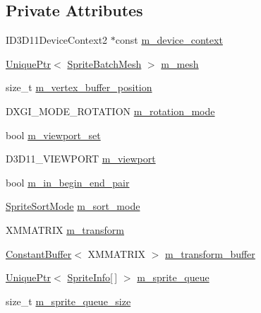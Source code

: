 \subsection*{Private Attributes}
\begin{DoxyCompactItemize}
\item 
I\+D3\+D11\+Device\+Context2 $\ast$const \hyperlink{classmage_1_1_sprite_batch_a95d4de79a01ffe5603a2cfa2eddd53b7}{m\+\_\+device\+\_\+context}
\item 
\hyperlink{namespacemage_a3316d7143a973e37adf1110f2e80ca31}{Unique\+Ptr}$<$ \hyperlink{classmage_1_1_sprite_batch_mesh}{Sprite\+Batch\+Mesh} $>$ \hyperlink{classmage_1_1_sprite_batch_a8e333637fa0af0858fd3a3efa1e59c3a}{m\+\_\+mesh}
\item 
size\+\_\+t \hyperlink{classmage_1_1_sprite_batch_afd6af84ab6728bfa907e6b8153357585}{m\+\_\+vertex\+\_\+buffer\+\_\+position}
\item 
D\+X\+G\+I\+\_\+\+M\+O\+D\+E\+\_\+\+R\+O\+T\+A\+T\+I\+ON \hyperlink{classmage_1_1_sprite_batch_ae062f178efe4a3af9c1573f8f8c4deee}{m\+\_\+rotation\+\_\+mode}
\item 
bool \hyperlink{classmage_1_1_sprite_batch_aefa38f98b30d09e3521ccdcc12bac6d0}{m\+\_\+viewport\+\_\+set}
\item 
D3\+D11\+\_\+\+V\+I\+E\+W\+P\+O\+RT \hyperlink{classmage_1_1_sprite_batch_a3029ab1ee01ccfc69fef88eb78d5bfc0}{m\+\_\+viewport}
\item 
bool \hyperlink{classmage_1_1_sprite_batch_a2f4e56ee07ef37a2906c552b0ea78403}{m\+\_\+in\+\_\+begin\+\_\+end\+\_\+pair}
\item 
\hyperlink{namespacemage_a256fa5833eecc408923de7ffadb5e014}{Sprite\+Sort\+Mode} \hyperlink{classmage_1_1_sprite_batch_a0b2b16b0d9eb63501b6fc0f9ce85e022}{m\+\_\+sort\+\_\+mode}
\item 
X\+M\+M\+A\+T\+R\+IX \hyperlink{classmage_1_1_sprite_batch_ad8a12f1f6c8289548346d469c9436c58}{m\+\_\+transform}
\item 
\hyperlink{structmage_1_1_constant_buffer}{Constant\+Buffer}$<$ X\+M\+M\+A\+T\+R\+IX $>$ \hyperlink{classmage_1_1_sprite_batch_ac8ff5a2d9956b4a33cb1f41310abf129}{m\+\_\+transform\+\_\+buffer}
\item 
\hyperlink{namespacemage_a3316d7143a973e37adf1110f2e80ca31}{Unique\+Ptr}$<$ \hyperlink{structmage_1_1_sprite_info}{Sprite\+Info}\mbox{[}$\,$\mbox{]} $>$ \hyperlink{classmage_1_1_sprite_batch_a67ab116e403b626771f03f527efa6f2f}{m\+\_\+sprite\+\_\+queue}
\item 
size\+\_\+t \hyperlink{classmage_1_1_sprite_batch_a0d7dadf01e3b905072c1aaa6b8e42c0e}{m\+\_\+sprite\+\_\+queue\+\_\+size}

\end{DoxyCompactItemize}
